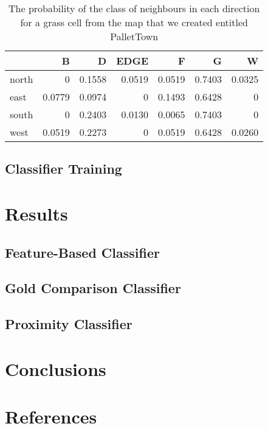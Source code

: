 \documentclass[preprint,5p,times,twocolumn]{elsarticle}
\begin{document}
\begin{table}[h]
\small
\begin{tabular}{ l | r r r r r r }
              & B      & D      & EDGE   & F      & G      & W \\ \hline
    north     & 0      & 0.1558 & 0.0519 & 0.0519 & 0.7403 & 0.0325\\
    east      & 0.0779 & 0.0974 & 0      & 0.1493 & 0.6428 & 0\\
    south     & 0      & 0.2403 & 0.0130 & 0.0065 & 0.7403 & 0\\
    west      & 0.0519 & 0.2273 & 0      & 0.0519 & 0.6428 & 0.0260\\
\end{tabular}
\caption{The probability of the class of neighbours in each direction for a
    grass cell from the map that we created entitled PalletTown} 
\end{table}


\subsection{Classifier Training}
\label{process:training}
\lipsum[1-2]


\section{Results}
\label{results}
\lipsum[1-2]


\subsection{Feature-Based Classifier}
\label{results:featurebased}
\lipsum[1-2]

\subsection{Gold Comparison Classifier}
\label{results:gold}
\lipsum[1-1]

\subsection{Proximity Classifier}
\label{results:proximity}
\lipsum[1-3]

\section{Conclusions}
\label{conclusions}
\lipsum[1-3]

\section{References}
\label{references}
\end{document}
